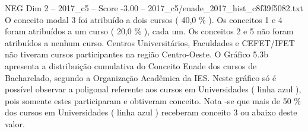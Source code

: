 \begin{textsample}{NEG Dim 2 – 2017\_c5 – Score -3.00 – 2017\_c5/enade\_2017\_hist\_c8f39f5082.txt}
O conceito modal 3 foi atribuído a dois cursos ( 40,0 \% ).
Os conceitos 1 e 4 foram atribuídos a um curso ( 20,0 \% ), cada um.
Os conceitos 2 e 5 não foram atribuídos a nenhum curso.
Centros Universitários, Faculdades e CEFET/IFET não tiveram cursos participantes na região Centro-Oeste.
O Gráfico 5.3b apresenta a distribuição cumulativa do Conceito Enade dos cursos de Bacharelado, segundo a Organização Acadêmica da IES.
Neste gráfico só é possível observar a poligonal referente aos cursos em Universidades ( linha azul ), pois somente estes participaram e obtiveram conceito.
Nota -se que mais de 50 \% dos cursos em Universidades ( linha azul ) receberam conceito 3 ou abaixo deste valor.

\end{textsample}
